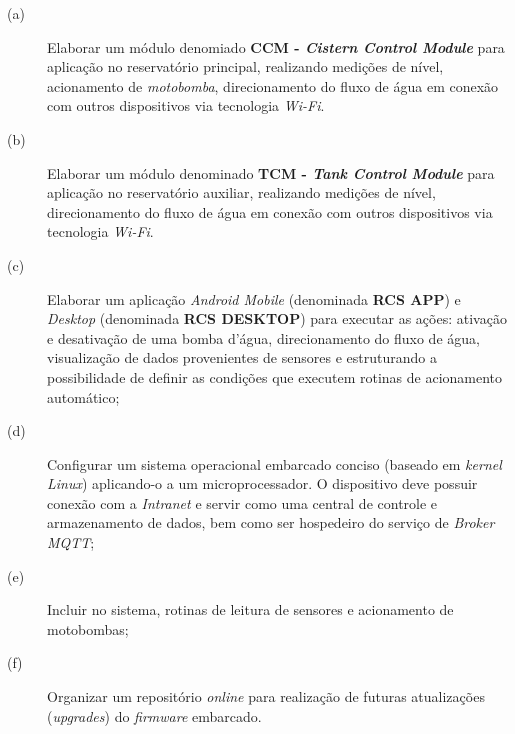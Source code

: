 \begin{description}
	\item [(a)] Elaborar um módulo denomiado \textbf{CCM - \textit{Cistern Control Module}} para aplicação no reservatório principal, realizando medições de nível, acionamento de \textit{motobomba}, direcionamento do fluxo de água em conexão com outros dispositivos via tecnologia \textit{Wi-Fi}.
	\item [(b)] Elaborar um módulo denominado \textbf{TCM - \textit{Tank Control Module}} para aplicação no reservatório auxiliar, realizando medições de nível, direcionamento do fluxo de água em conexão com outros dispositivos via tecnologia \textit{Wi-Fi}.
	\item [(c)] Elaborar um aplicação \textit{Android Mobile} (denominada \textbf{RCS APP}) e \textit{Desktop} (denominada \textbf{RCS DESKTOP}) para executar as ações: ativação e desativação de uma bomba d'água, direcionamento do fluxo de água, visualização de dados provenientes de sensores e estruturando a possibilidade de definir as condições que executem rotinas de acionamento automático;
	\item [(d)] Configurar um sistema operacional embarcado conciso (baseado em \textit{kernel Linux}) aplicando-o a um microprocessador. O dispositivo deve possuir conexão com a \textit{Intranet} e servir como uma central de controle e armazenamento de dados, bem como ser hospedeiro do serviço de \textit{Broker MQTT};
	\item [(e)] Incluir no sistema, rotinas de leitura de sensores e acionamento de motobombas;
	\item [(f)] Organizar um repositório \textit{online} para realização de futuras atualizações (\textit{upgrades}) do \textit{firmware} embarcado.
\end{description}

\label{sec:objetivosespecificos}